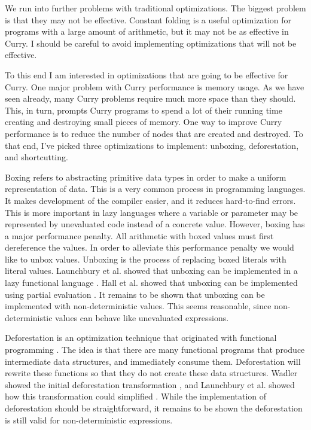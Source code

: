 We run into further problems with traditional optimizations.
The biggest problem is that they may not be effective.
Constant folding is a useful optimization for programs with a large amount of arithmetic,
but it may not be as effective in Curry.
I should be careful to avoid implementing optimizations that will not be effective.

To this end I am interested in optimizations that are going to be effective for Curry.
One major problem with Curry performance is memory usage.
As we have seen already, many Curry problems require much more space than they should.
This, in turn, prompts Curry programs to spend a lot of their running time creating and destroying
small pieces of memory.
One way to improve Curry performance is to reduce the number of nodes that are created and destroyed.
To that end, I've picked three optimizations to implement: unboxing, deforestation, and shortcutting.

Boxing refers to abstracting primitive data types in order to make a uniform representation of data.
This is a very common process in programming languages.  It makes development of the compiler easier,
and it reduces hard-to-find errors.
This is more important in lazy languages where a variable or parameter may be represented by unevaluated code
instead of a concrete value.
However, boxing has a major performance penalty.
All arithmetic with boxed values must first dereference the values.
In order to alleviate this performance penalty we would like to unbox values.
Unboxing is the process of replacing boxed literals with literal values.
Launchbury et al. showed that unboxing can be implemented in a lazy functional language \cite{unboxing}.
Hall et al. showed that unboxing can be implemented using partial evaluation \cite{unboxing_peval}.
It remains to be shown that unboxing can be implemented with non-deterministic values.
This seems reasonable, since non-deterministic values can behave like unevaluated expressions.

Deforestation is an optimization technique that originated with functional programming \cite{deforestation_wadler}.
The idea is that there are many functional programs that produce intermediate data structures, and immediately consume them.
Deforestation will rewrite these functions so that they do not create these data structures.
Wadler showed the initial deforestation transformation \cite{deforestation_wadler}, and 
Launchbury et al. showed how this transformation could simplified \cite{shortcut_deforestation}.
While the implementation of deforestation should be straightforward,
it remains to be shown the deforestation is still valid for non-deterministic expressions.

